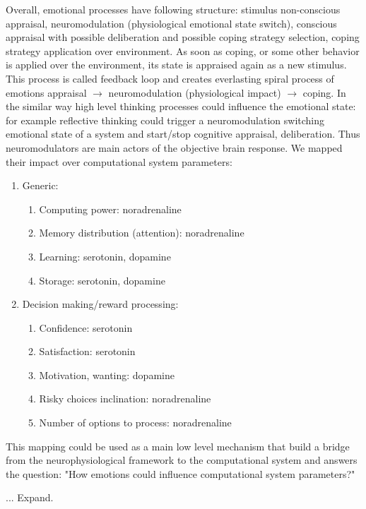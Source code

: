 Overall, emotional processes have following structure: stimulus non-conscious appraisal, neuromodulation (physiological emotional state switch), conscious appraisal with possible deliberation and possible coping strategy selection, coping strategy application over environment. As soon as coping, or some other behavior is applied over the environment, its state is appraised again as a new stimulus. This process is called feedback loop \cite{natureofemotions} and creates everlasting spiral process of emotions appraisal $\rightarrow$ neuromodulation (physiological impact) $\rightarrow$ coping. In the similar way high level thinking processes could influence the emotional state: for example reflective thinking could trigger a neuromodulation switching emotional state of a system and start/stop cognitive appraisal, deliberation.
Thus neuromodulators are main actors of the objective brain response. We mapped their impact over computational system parameters:

\begin{enumerate}
 \item  Generic:
 \begin{enumerate}
  \item  Computing power: noradrenaline
  \item  Memory distribution (attention): noradrenaline
  \item  Learning: serotonin, dopamine
  \item  Storage: serotonin, dopamine
 \end{enumerate}
 \item  Decision making/reward processing:
 \begin{enumerate}
  \item  Confidence: serotonin
  \item  Satisfaction: serotonin
  \item  Motivation, wanting: dopamine
  \item  Risky choices inclination: noradrenaline
  \item  Number of options to process: noradrenaline
 \end{enumerate}
\end{enumerate}

This mapping could be used as a main low level mechanism that build a bridge from the neurophysiological framework to the computational system and answers the question: "How emotions could influence computational system parameters?"

... Expand.

